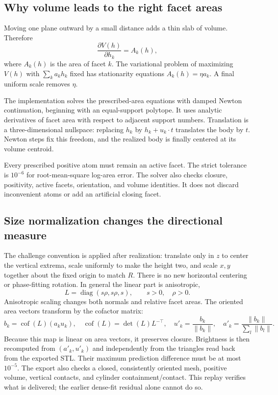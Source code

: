 \documentclass[11pt,a4paper]{article}
\newcommand{\norm}[1]{\left\lVert#1\right\rVert}
\newcommand{\diag}{\operatorname{diag}}
\newcommand{\cof}{\operatorname{cof}}
\begin{document}
\subsection*{Why volume leads to the right facet areas}
Moving one plane outward by a small distance adds a thin slab of volume. Therefore
\begin{equation}
 \frac{\partial V(h)}{\partial h_k}=A_k(h),
 \label{eq:volumederivative}
\end{equation}
where $A_k(h)$ is the area of facet $k$. The variational problem of maximizing $V(h)$ with $\sum_k a_kh_k$ fixed has stationarity equations $A_k(h)=\eta a_k$. A final uniform scale removes $\eta$.

The implementation solves the prescribed-area equations with damped Newton continuation, beginning with an equal-support polytope. It uses analytic derivatives of facet area with respect to adjacent support numbers. Translation is a three-dimensional nullspace: replacing $h_k$ by $h_k+u_k\cdot t$ translates the body by $t$. Newton steps fix this freedom, and the realized body is finally centered at its volume centroid.

Every prescribed positive atom must remain an active facet. The strict tolerance is $10^{-6}$ for root-mean-square log-area error. The solver also checks closure, positivity, active facets, orientation, and volume identities. It does not discard inconvenient atoms or add an artificial closing facet.

\subsection*{Size normalization changes the directional measure}
The challenge convention is applied after realization: translate only in $z$ to center the vertical extrema, scale uniformly to make the height two, and scale $x,y$ together about the fixed origin to match $R$. There is no new horizontal centering or phase-fitting rotation. In general the linear part is anisotropic,
\begin{equation}
 L=\diag(s\rho,s\rho,s),\qquad s>0,\quad\rho>0.
\end{equation}
Anisotropic scaling changes both normals and relative facet areas. The oriented area vectors transform by the cofactor matrix:
\begin{equation}
 b_k=\cof(L)(a_ku_k),\quad
 \cof(L)=\det(L)L^{-\top},\quad
 u'_k=\frac{b_k}{\norm{b_k}},\quad
 a'_k=\frac{\norm{b_k}}{\sum_l\norm{b_l}}.
 \label{eq:cofactor}
\end{equation}
Because this map is linear on area vectors, it preserves closure. Brightness is then recomputed from $(a'_k,u'_k)$ and independently from the triangles read back from the exported STL. Their maximum prediction difference must be at most $10^{-5}$. The export also checks a closed, consistently oriented mesh, positive volume, vertical contacts, and cylinder containment/contact. This replay verifies what is delivered; the earlier dense-fit residual alone cannot do so.
\end{document}
